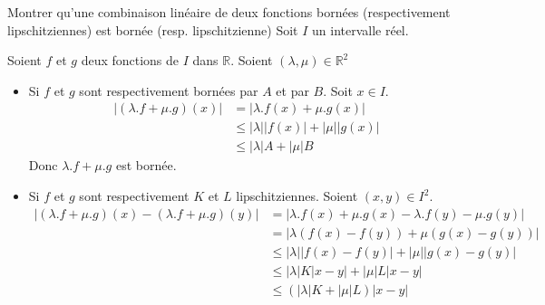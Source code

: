 \documentclass{article}
\begin{document}
\begin{question_kholle}{Montrer qu'une combinaison linéaire de deux fonctions bornées (respectivement lipschitziennes) est bornée (resp. lipschitzienne)}
	Soit $I$ un intervalle réel.
	
	Soient $f$ et $g$ deux fonctions de $I$ dans $\mathbb{R}$. Soient $(\lambda, \mu) \in \mathbb{R}^2$
	\begin{itemize}[label=$\lozenge$]
		\item Si $f$ et $g$ sont respectivement bornées par $A$ et par $B$.
		Soit $x \in I$.
		\begin{align*}
			\Big| (\lambda.f + \mu.g)(x) \Big| &= \Big| \lambda.f(x) + \mu.g(x) \Big| \\
			&\leqslant \big| \lambda \big|  \big|f(x)\big| + \big| \mu \big|  \big| g(x) \big| \\
			&\leqslant \big| \lambda \big| A + \big| \mu \big| B
		\end{align*}
		Donc $\lambda.f + \mu.g$ est bornée.
		\item Si $f$ et $g$ sont respectivement $K$ et $L$ lipschitziennes.
		Soient $(x, y) \in I^2$.
		\begin{align*}
			\Big| (\lambda.f + \mu.g)(x) - (\lambda.f + \mu.g)(y)\Big| &= \Big| \lambda.f(x) + \mu.g(x) - \lambda.f(y) - \mu.g(y) \Big| \\
			&= \Big| \lambda(f(x) - f(y)) + \mu(g(x) - g(y)) \Big| \\
			&\leqslant \Big| \lambda  \Big|  \Big| f(x) - f(y) \Big| + \Big| \mu \Big|  \Big|g(x) - g(y) \Big|  \\
			&\leqslant \Big| \lambda  \Big|  K \Big| x-y \Big| + \Big| \mu  \Big| L  \Big| x - y \Big|  \\
			& \leqslant (|\lambda| K + |\mu|L ) |x - y|
		\end{align*}
	\end{itemize}
\end{question_kholle}
\end{document}
